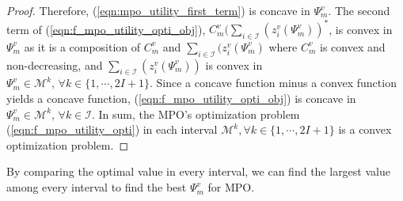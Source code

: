 \documentclass[conference]{IEEEtran}
\begin{document}
\begin{proof}
Therefore, (\ref{eqn:mpo_utility_first_term}) is concave in $\Psi_m^v$. The second term of (\ref{eqn:f_mpo_utility_opti_obj}), $C_m^v\big(\sum_{i \in \mathcal{I}} (z_{i}^v(\Psi_m^v))^*$, is convex in $\Psi_m^v$ as it is a composition of $C_m^v$ and $\sum_{i \in \mathcal{I}} (z_{i}^v(\Psi_m^v)$ where $C_m^v$ is convex and non-decreasing, and $\sum_{i \in \mathcal{I}} (z_{i}^v(\Psi_m^v))$ is convex in $\Psi_m^v \in \mathcal{M}^k,\, \forall k \in \{1, \cdots, 2I+1\}$. Since a concave function minus a convex function yields a concave function, (\ref{eqn:f_mpo_utility_opti_obj}) is concave in $\Psi_m^v \in \mathcal{M}^k,\, \forall k \in \mathcal{I}$. In sum, the MPO's optimization problem (\ref{eqn:f_mpo_utility_opti}) in each interval $\mathcal{M}^k, \forall k \in \{1, \cdots, 2I+1\}$ is a convex optimization problem. \qedhere
\end{proof}
By comparing the optimal value in every interval, we can find the largest value among every interval to find the best $\Psi_m^v$ for MPO.
\end{document}
